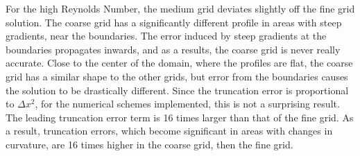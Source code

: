 For the high Reynolds Number, the medium grid deviates slightly off the fine grid solution.  The coarse grid has a significantly different profile in areas with steep gradients, near the boundaries.  The error induced by steep gradients at the boundaries propagates inwards, and as a results, the coarse grid is never really accurate.  Close to the center of the domain, where the profiles are flat, the coarse grid has a similar shape to the other grids, but error from the boundaries causes the solution to be drastically different.  Since the truncation error is proportional to $\Delta x^2$, for the numerical schemes implemented, this is not a surprising result.  The leading truncation error term is 16 times larger than that of the fine grid. As a result, truncation errors, which become significant in areas with changes in curvature, are 16 times higher in the coarse grid, then the fine grid.



